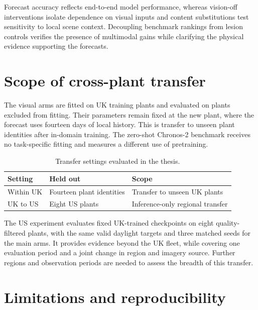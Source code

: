 Forecast accuracy reflects end-to-end model performance, whereas vision-off interventions isolate dependence on visual inputs and content substitutions test sensitivity to local scene context. Decoupling benchmark rankings from lesion controls verifies the presence of multimodal gains while clarifying the physical evidence supporting the forecasts.

\section{Scope of cross-plant transfer}

The visual arms are fitted on UK training plants and evaluated on plants excluded from fitting. Their parameters remain fixed at the new plant, where the forecast uses fourteen days of local history. This is transfer to unseen plant identities after in-domain training. The zero-shot Chronos-2 benchmark receives no task-specific fitting and measures a different use of pretraining.

\begin{table}[htbp]
\centering
\begin{tabularx}{\textwidth}{@{}llY@{}}
\hline
Setting & Held out & Scope \\
\hline
Within UK & Fourteen plant identities & Transfer to unseen UK plants \\
UK to US & Eight US plants & Inference-only regional transfer \\
\hline
\end{tabularx}
\caption{Transfer settings evaluated in the thesis.}
\label{tab:transfer-claims}
\end{table}

The US experiment evaluates fixed UK-trained checkpoints on eight quality-filtered plants, with the same valid daylight targets and three matched seeds for the main arms. It provides evidence beyond the UK fleet, while covering one evaluation period and a joint change in region and imagery source. Further regions and observation periods are needed to assess the breadth of this transfer.

\section{Limitations and reproducibility}

